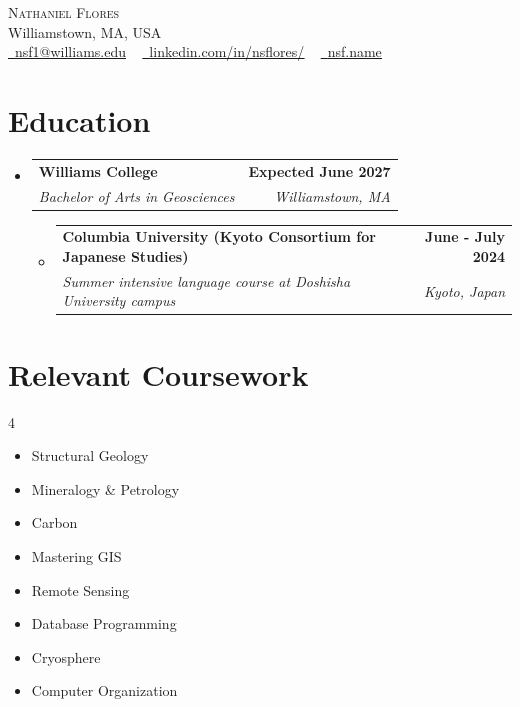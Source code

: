 \documentclass[letterpaper, 11pt]{article}
\makeatletter
\newcommand{\resumeItem}[1]{ \item\small{ {#1 \vspace{-2pt}} } }
\newcommand{\resumeSubheading}[4]{
\vspace{-2pt}
\item
\begin{tabular*}{1.0\textwidth}[t]{l@{\extracolsep{\fill}}r}
	\textbf{#1}       & \textbf{\small #2} \\
	\textit{\small#3} & \textit{\small #4} \\
\end{tabular*}
\vspace{-8pt}
}
\newcommand{\resumeSubHeadingListStart}{\begin{itemize}[leftmargin=0.0in, label={}]}
\newcommand{\resumeSubHeadingListEnd}{\end{itemize}}
\newcommand{\resumeItemListStart}{\vspace{-6pt}\begin{itemize}}
\newcommand{\resumeItemListEnd}{\end{itemize}
\vspace{-6pt}}
\makeatother
\begin{document}
	\begin{center}
		{\Huge \scshape Nathaniel Flores} \\
		\vspace{1pt}
		Williamstown, MA, USA\\
		\vspace{1pt}
		\href{mailto:nsf1@williams.edu}{\raisebox{-0.2\height}{\faEnvelope}\ \underline{nsf1@williams.edu}}
		~
		\href{https://www.linkedin.com/in/nsflores/}{\raisebox{-0.2\height}{\faLinkedin}\ \underline{linkedin.com/in/nsflores/}}
                ~
                \href{https://nsf.name/}{\raisebox{-0.2\height}{\faGlobe}\ \underline{nsf.name}}
		\vspace{-8pt}
	\end{center}

	\section{Education}
	\resumeSubHeadingListStart \resumeSubheading {Williams College}{Expected June 2027}
	{Bachelor of Arts in Geosciences}{Williamstown, MA}
        \resumeSubHeadingListStart \resumeSubheading {Columbia University (Kyoto Consortium for Japanese Studies)}{June - July 2024}
	{Summer intensive language course at Doshisha University campus}{Kyoto, Japan}
	\resumeItemListEnd \resumeSubHeadingListEnd

	\section{Relevant Coursework}
	\begin{multicols}{4}
          {\small \begin{itemize}[itemsep=-5pt, parsep=3pt]
                \item Structural Geology

		\item Mineralogy \& Petrology

                \item Carbon

		\item Mastering GIS

		\item Remote Sensing

		\item Database Programming

		\item Cryosphere

		\item Computer Organization
            \end{itemize} }
	\end{multicols}
	\vspace*{2.0\multicolsep}
\end{document}
